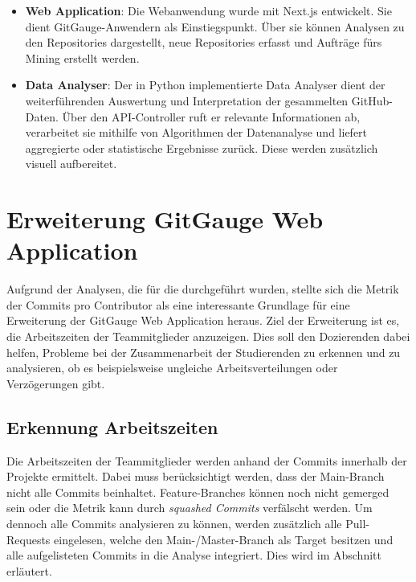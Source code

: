 \begin{itemize}
    \item \textbf{Web Application}: Die Webanwendung wurde mit Next.js entwickelt. Sie dient GitGauge-Anwendern als Einstiegspunkt. Über sie können Analysen zu den Repositories dargestellt, neue Repositories erfasst und Aufträge fürs Mining erstellt werden. 
    \item \textbf{Data Analyser}:  Der in Python implementierte Data Analyser dient der weiterführenden Auswertung und Interpretation der gesammelten GitHub-Daten. Über den API-Controller ruft er relevante Informationen ab, verarbeitet sie mithilfe von Algorithmen der Datenanalyse und liefert aggregierte oder statistische Ergebnisse zurück. Diese werden zusätzlich visuell aufbereitet.
\end{itemize}

\section{Erweiterung GitGauge Web Application}
Aufgrund der Analysen, die für die  durchgeführt wurden, stellte sich die Metrik der Commits pro Contributor als eine interessante Grundlage für eine Erweiterung der GitGauge Web Application heraus.  
Ziel der Erweiterung ist es, die Arbeitszeiten der Teammitglieder anzuzeigen. Dies soll den Dozierenden dabei helfen, Probleme bei der Zusammenarbeit der Studierenden zu erkennen und zu analysieren, ob es beispielsweise ungleiche Arbeitsverteilungen oder Verzögerungen gibt.

\subsection{Erkennung Arbeitszeiten}
Die Arbeitszeiten der Teammitglieder werden anhand der Commits innerhalb der Projekte ermittelt. Dabei muss berücksichtigt werden, dass der Main-Branch nicht alle Commits beinhaltet. Feature-Branches können noch nicht gemerged sein oder die Metrik kann durch \textit{squashed Commits} verfälscht werden. Um dennoch alle Commits analysieren zu können, werden zusätzlich alle Pull-Requests eingelesen, welche den Main-/Master-Branch als Target besitzen und alle aufgelisteten Commits in die Analyse integriert. Dies wird im Abschnitt  erläutert.

